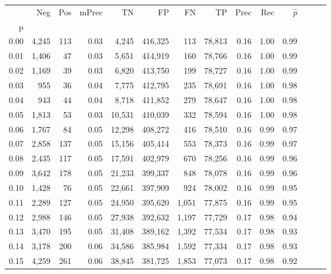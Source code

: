 \begin{tabular}{rrrrrrrrrrrrrr}
\toprule
{} &    Neg &    Pos & mPrec &       TN &       FP &      FN &      TP &  Prec &   Rec & $\hat{p}$ \\
p    &        &        &       &          &          &         &         &       &       &           \\
\midrule
0.00 &  4,245 &    113 &  0.03 &    4,245 &  416,325 &     113 &  78,813 &  0.16 &  1.00 &      0.99 \\
0.01 &  1,406 &     47 &  0.03 &    5,651 &  414,919 &     160 &  78,766 &  0.16 &  1.00 &      0.99 \\
0.02 &  1,169 &     39 &  0.03 &    6,820 &  413,750 &     199 &  78,727 &  0.16 &  1.00 &      0.99 \\
0.03 &    955 &     36 &  0.04 &    7,775 &  412,795 &     235 &  78,691 &  0.16 &  1.00 &      0.98 \\
0.04 &    943 &     44 &  0.04 &    8,718 &  411,852 &     279 &  78,647 &  0.16 &  1.00 &      0.98 \\
0.05 &  1,813 &     53 &  0.03 &   10,531 &  410,039 &     332 &  78,594 &  0.16 &  1.00 &      0.98 \\
0.06 &  1,767 &     84 &  0.05 &   12,298 &  408,272 &     416 &  78,510 &  0.16 &  0.99 &      0.97 \\
0.07 &  2,858 &    137 &  0.05 &   15,156 &  405,414 &     553 &  78,373 &  0.16 &  0.99 &      0.97 \\
0.08 &  2,435 &    117 &  0.05 &   17,591 &  402,979 &     670 &  78,256 &  0.16 &  0.99 &      0.96 \\
0.09 &  3,642 &    178 &  0.05 &   21,233 &  399,337 &     848 &  78,078 &  0.16 &  0.99 &      0.96 \\
0.10 &  1,428 &     76 &  0.05 &   22,661 &  397,909 &     924 &  78,002 &  0.16 &  0.99 &      0.95 \\
0.11 &  2,289 &    127 &  0.05 &   24,950 &  395,620 &   1,051 &  77,875 &  0.16 &  0.99 &      0.95 \\
0.12 &  2,988 &    146 &  0.05 &   27,938 &  392,632 &   1,197 &  77,729 &  0.17 &  0.98 &      0.94 \\
0.13 &  3,470 &    195 &  0.05 &   31,408 &  389,162 &   1,392 &  77,534 &  0.17 &  0.98 &      0.93 \\
0.14 &  3,178 &    200 &  0.06 &   34,586 &  385,984 &   1,592 &  77,334 &  0.17 &  0.98 &      0.93 \\
0.15 &  4,259 &    261 &  0.06 &   38,845 &  381,725 &   1,853 &  77,073 &  0.17 &  0.98 &      0.92 \\

\end{tabular}

